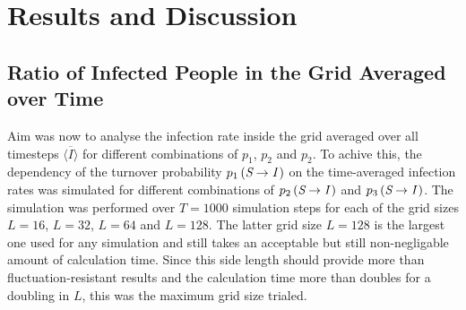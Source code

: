 \section{Results and Discussion}



\subsection{Ratio of Infected People in the Grid Averaged over Time}

Aim was now to analyse the infection rate inside the grid averaged over all timesteps $\overline{\langle I\rangle}$ for different combinations of $p_1$, $p_2$ and $p_2$. To achive this, the dependency of the 
turnover probability $p_1\left(\textit{S}\rightarrow\textit{I}\,\right)$ on the time-averaged infection rates was simulated for different combinations of $p_2\left(\textit{S}\rightarrow\textit{I}\,\right)$
and $p_3\left(\textit{S}\rightarrow\textit{I}\,\right)$. The simulation was performed over $T=1000$ simulation steps for each of the grid sizes $L=16$, $L=32$, $L=64$ and $L=128$.
The latter grid size $L=128$ is the largest one used for any simulation and still takes an acceptable but still non-negligable amount of calculation time.
Since this side length should provide more than fluctuation-resistant results and the calculation time more than doubles for a doubling in $L$, this was the maximum grid size trialed.

